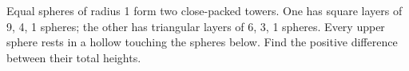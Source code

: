 Equal spheres of radius 1 form two close-packed towers. One has square layers of 9, 4, 1 spheres; the other has triangular layers of 6, 3, 1 spheres. Every upper sphere rests in a hollow touching the spheres below. Find the positive difference between their total heights.
